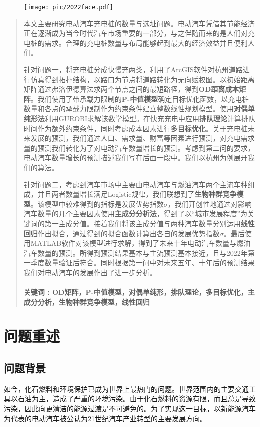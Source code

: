 \documentclass[12pt, a4paper, oneside]{ctexart}
\begin{document}
\thispagestyle{empty}
\begin{figure}[H]
  \centering
  \texttt{[image: pic/2022face.pdf]}
\end{figure}


\newpage
\setcounter{page}{1}
\begin{abstract}
  本文主要研究电动汽车充电桩的数量与选址问题。电动汽车凭借其节能经济正在逐渐成为当今时代汽车市场重要的一部分，与之伴随而来的是人们对充电桩的需求。合理的充电桩数量与布局能够起到最大的经济效益并且便利人们。

  针对问题一，将充电桩分成快慢充两类，利用了ArcGIS软件对杭州道路进行仿真得到拓扑结构，以路口为节点将道路转化为无向赋权图。以初始距离矩阵通过弗洛伊德算法求两个节点之间的最短路径，得到{\bf OD距离成本矩阵}。我们使用了带承载力限制的{\bf P-中值模型}确定目标优化函数，以充电桩数量和各点的承载力限制作为约束条件建立整数线性规划模型。使用{\bf 对偶单纯形法}利用GUROBI求解该数学模型。在快充充电中应用{\bf 排队理论}计算排队时间作为额外约束条件，同时考虑成本因素进行{\bf 多目标优化}。关于充电桩未来发展的预测，我们通过人口、需求量、财富等因素进行预测，对充电需求量的预测我们转化为了对电动汽车数量增长的预测。考虑到第二问的要求，电动汽车数量增长的预测描述我们写在后面一段中。我们以杭州为例展开我们的算法。
  
  针对问题二，考虑到汽车市场中主要由电动汽车与燃油汽车两个主流车种组成，并且两者数量增长满足Logistic规律，我们联想到了{\bf 生物种群竞争模型}。该模型中较难得到的指标是发展优势指数$\sigma$，我们开创性地通过对影响汽车数量的几个主要因素使用{\bf 主成分分析法}，得到了以“城市发展程度”为关键词的第一主成分值。接着我们将该主成分值与两种汽车数量分别运用{\bf 线性回归}作出拟合，通过得到的拟合函数计算出各自的发展优势指数$\sigma$。最后使用MATLAB软件对该模型进行求解，得到了未来十年电动汽车数量与燃油汽车数量的预测。所得到预测结果基本与主流预测基本接近，且与2022年第一季度数量验证后符合。同时根据第一问中对未来五年、十年后的预测结果我们对电动汽车的发展作出了进一步分析。\\\\
\textbf{关键词 : OD矩阵，P-中值模型，对偶单纯形，排队理论，多目标优化，主成分分析，生物种群竞争模型，线性回归}
\end{abstract}
\newpage
\section{问题重述}
\subsection{问题背景}
如今，化石燃料和环境保护已成为世界上最热门的问题。世界范围内的主要交通工具以石油为主，造成了严重的环境污染。由于化石燃料的资源有限，而且总是导致污染，因此向更清洁的能源过渡是不可避免的。为了实现这一目标，以新能源汽车为代表的电动汽车被公认为21世纪汽车产业转型的主要发展方向。
\end{document}
